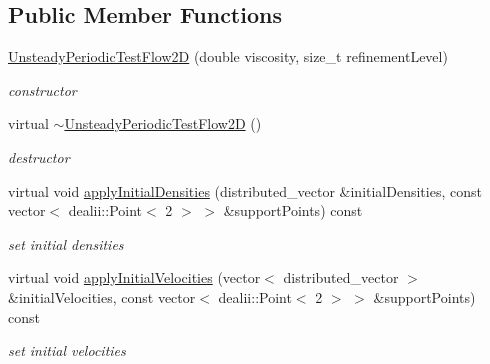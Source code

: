 \subsection*{Public Member Functions}
\begin{DoxyCompactItemize}
\item 
\hypertarget{classnatrium_1_1UnsteadyPeriodicTestFlow2D_a3a513d06c9018e78041cf8179ef2d80f}{\hyperlink{classnatrium_1_1UnsteadyPeriodicTestFlow2D_a3a513d06c9018e78041cf8179ef2d80f}{Unsteady\-Periodic\-Test\-Flow2\-D} (double viscosity, size\-\_\-t refinement\-Level)}\label{classnatrium_1_1UnsteadyPeriodicTestFlow2D_a3a513d06c9018e78041cf8179ef2d80f}

\begin{DoxyCompactList}\small\item\em constructor \end{DoxyCompactList}\item 
\hypertarget{classnatrium_1_1UnsteadyPeriodicTestFlow2D_aa91ea175e2993bf00f8a48fded987c54}{virtual \hyperlink{classnatrium_1_1UnsteadyPeriodicTestFlow2D_aa91ea175e2993bf00f8a48fded987c54}{$\sim$\-Unsteady\-Periodic\-Test\-Flow2\-D} ()}\label{classnatrium_1_1UnsteadyPeriodicTestFlow2D_aa91ea175e2993bf00f8a48fded987c54}

\begin{DoxyCompactList}\small\item\em destructor \end{DoxyCompactList}\item 
virtual void \hyperlink{classnatrium_1_1UnsteadyPeriodicTestFlow2D_a089ab3cde76dfade1eb8705051af123f}{apply\-Initial\-Densities} (distributed\-\_\-vector \&initial\-Densities, const vector$<$ dealii\-::\-Point$<$ 2 $>$ $>$ \&support\-Points) const 
\begin{DoxyCompactList}\small\item\em set initial densities \end{DoxyCompactList}\item 
virtual void \hyperlink{classnatrium_1_1UnsteadyPeriodicTestFlow2D_a5755fda1ff3726ffc543cf86b618d71e}{apply\-Initial\-Velocities} (vector$<$ distributed\-\_\-vector $>$ \&initial\-Velocities, const vector$<$ dealii\-::\-Point$<$ 2 $>$ $>$ \&support\-Points) const 
\begin{DoxyCompactList}\small\item\em set initial velocities \end{DoxyCompactList}\end{DoxyCompactItemize}


